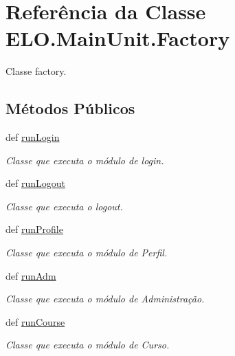 \hypertarget{classELO_1_1MainUnit_1_1Factory}{\section{Referência da Classe E\-L\-O.\-Main\-Unit.\-Factory}
\label{classELO_1_1MainUnit_1_1Factory}
}


Classe factory.  


\subsection*{Métodos Públicos}
\begin{DoxyCompactItemize}
\item 
def \hyperlink{classELO_1_1MainUnit_1_1Factory_a515d1ff460a335b750e58e0cbddf20ae}{run\-Login}
\begin{DoxyCompactList}\small\item\em Classe que executa o módulo de login. \end{DoxyCompactList}\item 
def \hyperlink{classELO_1_1MainUnit_1_1Factory_aa26c51486ba65030399897a6e3b4f4f1}{run\-Logout}
\begin{DoxyCompactList}\small\item\em Classe que executa o logout. \end{DoxyCompactList}\item 
def \hyperlink{classELO_1_1MainUnit_1_1Factory_ab20a76f74180fc77c6b8fcd8de7942f1}{run\-Profile}
\begin{DoxyCompactList}\small\item\em Classe que executa o módulo de Perfil. \end{DoxyCompactList}\item 
def \hyperlink{classELO_1_1MainUnit_1_1Factory_a533b402a54bf6f6715824a8687fa7a24}{run\-Adm}
\begin{DoxyCompactList}\small\item\em Classe que executa o módulo de Administração. \end{DoxyCompactList}\item 
def \hyperlink{classELO_1_1MainUnit_1_1Factory_a5e360bc5396fd576e0614b9e157b3816}{run\-Course}
\begin{DoxyCompactList}\small\item\em Classe que executa o módulo de Curso. \end{DoxyCompactList}\end{DoxyCompactItemize}


